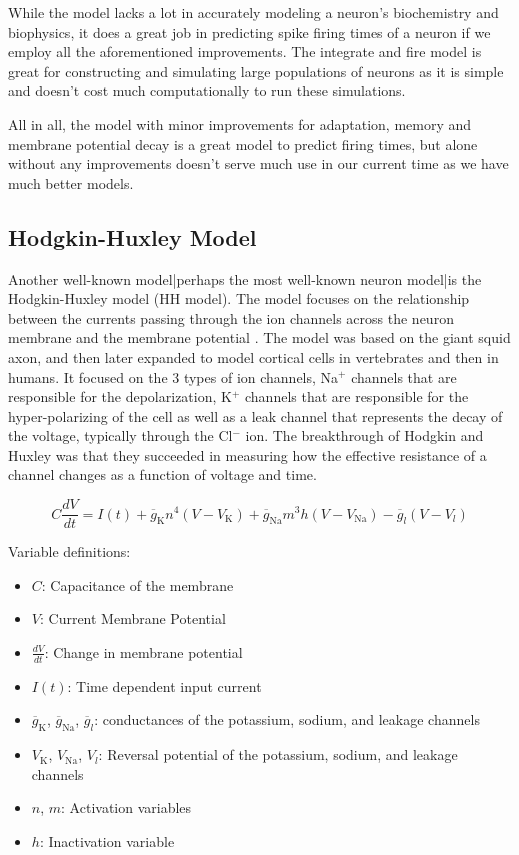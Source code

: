 \documentclass[11pt]{article}
\begin{document}
While the model lacks a lot in accurately modeling a neuron's biochemistry and biophysics, it does a great job in predicting spike firing times of a neuron if we employ all the aforementioned improvements. The integrate and fire model is great for constructing and simulating large populations of neurons as it is simple and doesn't cost much computationally to run these simulations.

All in all, the model with minor improvements for adaptation, memory and membrane potential decay is a great model to predict firing times, but alone without any improvements doesn't serve much use in our current time as we have much better models.

\subsection{Hodgkin-Huxley Model}
\label{sec:hh_model}
Another well-known model|perhaps the most well-known neuron model|is the Hodgkin-Huxley model (HH model). The model focuses on the relationship between the currents passing through the ion channels across the neuron membrane and the membrane potential \citep{hh}. The model was based on the giant squid axon, and then later expanded to model cortical cells in vertebrates and then in humans. It focused on the 3 types of ion channels, Na$^+$ channels that are responsible for the depolarization, K$^+$ channels that are responsible for the hyper-polarizing of the cell as well as a leak channel that represents the decay of the voltage, typically through the Cl$^-$ ion. The breakthrough of Hodgkin and Huxley was that they succeeded in measuring how the effective resistance of a channel changes as a function of voltage and time.

\begin{equation}
    C \frac{dV}{dt} = I(t) + \overline{g}_\text{K} n^4 (V - V_\text{K}) + \overline{g}_\text{Na} m^3h(V - V_\text{Na}) - \overline{g}_l(V - V_l)
    \label{eq:hodgkin_huxley}
\end{equation}

Variable definitions:
\begin{itemize}
    \item $C$: Capacitance of the membrane
    \item $V$: Current Membrane Potential
    \item $\frac{dV}{dt}$: Change in membrane potential
    \item $I(t)$: Time dependent input current
    \item $\overline{g}_\text{K}$, $\overline{g}_\text{Na}$, $\overline{g}_l$: conductances of the potassium, sodium, and leakage channels
    \item $V_\text{K}$, $V_\text{Na}$, $V_l$: Reversal potential of the potassium, sodium, and leakage channels
    \item $n$, $m$: Activation variables
    \item $h$: Inactivation variable
\end{itemize}
\end{document}
